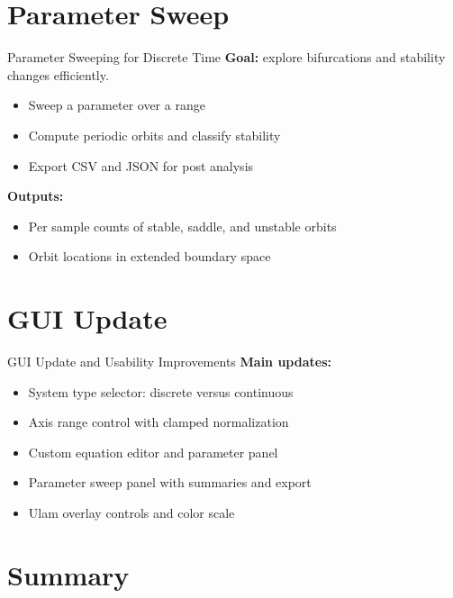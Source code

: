 \documentclass[aspectratio=169]{beamer}
\begin{document}
\section{Parameter Sweep}

\begin{frame}{Parameter Sweeping for Discrete Time}
  \textbf{Goal:} explore bifurcations and stability changes efficiently.

  \vspace{4pt}
  \begin{itemize}
    \item Sweep a parameter over a range
    \item Compute periodic orbits and classify stability
    \item Export CSV and JSON for post analysis
  \end{itemize}

  \vspace{6pt}
  \textbf{Outputs:}
  \begin{itemize}
    \item Per sample counts of stable, saddle, and unstable orbits
    \item Orbit locations in extended boundary space
  \end{itemize}
\end{frame}

\section{GUI Update}

\begin{frame}{GUI Update and Usability Improvements}
  \textbf{Main updates:}
  \begin{itemize}
    \item System type selector: discrete versus continuous
    \item Axis range control with clamped normalization
    \item Custom equation editor and parameter panel
    \item Parameter sweep panel with summaries and export
    \item Ulam overlay controls and color scale
  \end{itemize}
\end{frame}

\section{Summary}
\end{document}

